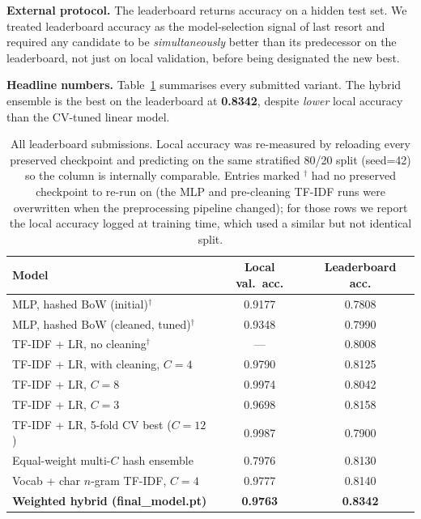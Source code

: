 \documentclass[10pt]{article}
\begin{document}
\textbf{External protocol.} The leaderboard returns accuracy on a hidden test set. We treated leaderboard accuracy as the model-selection signal of last resort and required any candidate to be \emph{simultaneously} better than its predecessor on the leaderboard, not just on local validation, before being designated the new best.

\textbf{Headline numbers.} Table~\ref{tab:results} summarises every submitted variant. The hybrid ensemble is the best on the leaderboard at \textbf{0.8342}, despite \emph{lower} local accuracy than the CV-tuned linear model.

\begin{table}[h]
\centering
\small
\begin{tabular}{lcc}
\toprule
Model & Local val.\ acc. & Leaderboard acc. \\
\midrule
MLP, hashed BoW (initial)$^{\dagger}$            & 0.9177 & 0.7808 \\
MLP, hashed BoW (cleaned, tuned)$^{\dagger}$     & 0.9348 & 0.7990 \\
TF-IDF + LR, no cleaning$^{\dagger}$             & ---    & 0.8008 \\
TF-IDF + LR, with cleaning, $C{=}4$              & 0.9790 & 0.8125 \\
TF-IDF + LR, $C{=}8$                             & 0.9974 & 0.8042 \\
TF-IDF + LR, $C{=}3$                             & 0.9698 & 0.8158 \\
TF-IDF + LR, 5-fold CV best ($C{=}12$)           & 0.9987 & 0.7900 \\
Equal-weight multi-$C$ hash ensemble             & 0.7976 & 0.8130 \\
Vocab + char $n$-gram TF-IDF, $C{=}4$            & 0.9777 & 0.8140 \\
\textbf{Weighted hybrid (final\_model.pt)}       & \textbf{0.9763} & \textbf{0.8342} \\
\bottomrule
\end{tabular}
\caption{All leaderboard submissions. Local accuracy was re-measured by reloading every preserved checkpoint and predicting on the same stratified 80/20 split (seed=42) so the column is internally comparable. Entries marked $^{\dagger}$ had no preserved checkpoint to re-run on (the MLP and pre-cleaning TF-IDF runs were overwritten when the preprocessing pipeline changed); for those rows we report the local accuracy logged at training time, which used a similar but not identical split.}
\label{tab:results}
\end{table}
\end{document}
